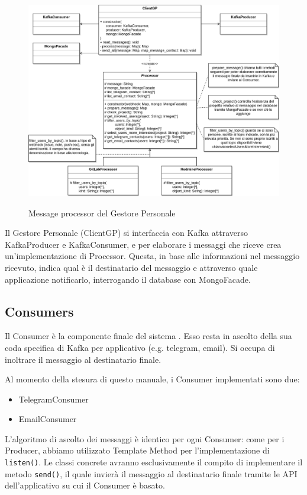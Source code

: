     \begin{figure}[H]
        \centering
        \includegraphics[width=\textwidth]{img/GP-Processor.png}\\
        \caption{Message processor del Gestore Personale}
        \label{fig:GP-Processor}
    \end{figure}

    Il Gestore Personale (ClientGP) si interfaccia con Kafka attraverso KafkaProducer e KafkaConsumer, e per elaborare i messaggi che riceve crea un'implementazione di Processor. Questa, in base alle informazioni nel messaggio ricevuto, indica qual è il destinatario del messaggio e attraverso quale applicazione notificarlo, interrogando il database con MongoFacade.

\subsection{Consumers}
Il Consumer è la componente finale del sistema \progetto. Esso resta in ascolto della sua coda specifica di Kafka per applicativo (e.g. telegram, email).
Si occupa di inoltrare il messaggio al destinatario finale.

Al momento della stesura di questo manuale, i Consumer implementati sono due:

\begin{itemize}
    \item TelegramConsumer
    \item EmailConsumer
\end{itemize}

L'algoritmo di ascolto dei messaggi è identico per ogni Consumer: come per i Producer, abbiamo utilizzato
Template Method per l'implementazione di \texttt{listen()}.
Le classi concrete avranno esclusivamente il compito di implementare il metodo \texttt{send()}, il quale invierà il messaggio
al destinatario finale tramite le API dell'applicativo su cui il Consumer è basato.


